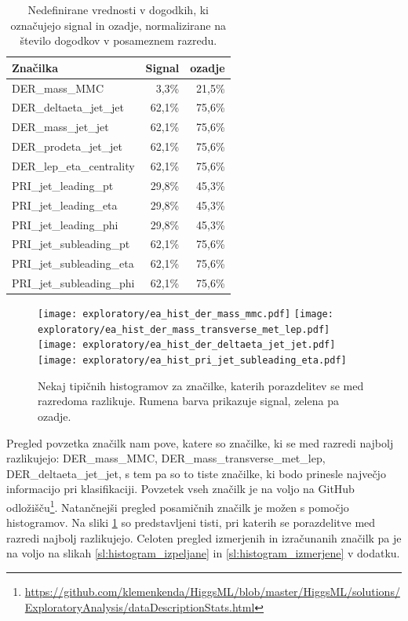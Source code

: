 \documentclass[11pt,a4paper,openany]{book}
\begin{document}
\begin{table}[ht]
	\centering
	\begin{tabular}{lrr}
		\hline
		\textbf{Značilka} &         \textbf{Signal} &         \textbf{ozadje} \\
		\hline
		DER\_mass\_MMC            &  3,3\%  &  21,5\% \\
		DER\_deltaeta\_jet\_jet   &  62,1\% &  75,6\% \\
		DER\_mass\_jet\_jet       &  62,1\% &  75,6\% \\
		DER\_prodeta\_jet\_jet    &  62,1\% &  75,6\% \\
		DER\_lep\_eta\_centrality &  62,1\% &  75,6\% \\
		PRI\_jet\_leading\_pt     &  29,8\% &  45,3\% \\
		PRI\_jet\_leading\_eta    &  29,8\% &  45,3\% \\
		PRI\_jet\_leading\_phi    &  29,8\% &  45,3\% \\
		PRI\_jet\_subleading\_pt  &  62,1\% &  75,6\% \\
		PRI\_jet\_subleading\_eta &  62,1\% &  75,6\% \\
		PRI\_jet\_subleading\_phi &  62,1\% &  75,6\% \\
	\end{tabular}
	\caption{Nedefinirane vrednosti v dogodkih, ki označujejo signal in ozadje, normalizirane na število dogodkov v posameznem razredu.}
	\label{tb:manjkajoce_vrednosti}
\end{table}

\begin{figure}[ht!]
	\texttt{[image: exploratory/ea\_hist\_der\_mass\_mmc.pdf]}
	\texttt{[image: exploratory/ea\_hist\_der\_mass\_transverse\_met\_lep.pdf]}	
	\texttt{[image: exploratory/ea\_hist\_der\_deltaeta\_jet\_jet.pdf]}		
	\texttt{[image: exploratory/ea\_hist\_pri\_jet\_subleading\_eta.pdf]}	
	\caption{Nekaj tipičnih histogramov za značilke, katerih porazdelitev se med razredoma razlikuje. Rumena barva prikazuje signal, zelena pa ozadje.}
	\label{sl:histogrami}			
\end{figure}

Pregled povzetka značilk nam pove, katere so značilke, ki se med razredi najbolj razlikujejo: DER\_mass\_MMC, DER\_mass\_transverse\_met\_lep, DER\_deltaeta\_jet\_jet, s tem pa so to tiste značilke, ki bodo prinesle največjo informacijo pri klasifikaciji. Povzetek vseh značilk je na voljo na GitHub odložišču\footnote{\url{https://github.com/klemenkenda/HiggsML/blob/master/HiggsML/solutions/ExploratoryAnalysis/dataDescriptionStats.html}}. Natančnejši pregled posamičnih značilk je možen s pomočjo histogramov. Na sliki \ref{sl:histogrami} so predstavljeni tisti, pri katerih se porazdelitve med razredi najbolj razlikujejo. Celoten pregled izmerjenih in izračunanih značilk pa je na voljo na slikah \ref{sl:histogram_izpeljane} in \ref{sl:histogram_izmerjene} v dodatku.
\end{document}
